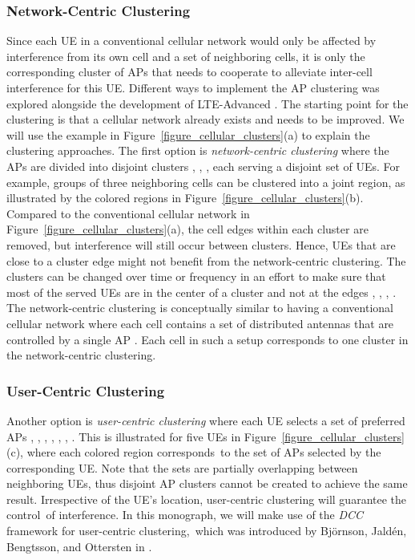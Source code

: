 \subsubsection{Network-Centric Clustering}
\enlargethispage{\baselineskip} 
Since each \gls{UE} in a conventional cellular network would only be affected by interference from its own cell and a set of neighboring cells, it is only the corresponding cluster of \glspl{AP} that needs to cooperate to alleviate inter-cell interference for this \gls{UE}. 
Different ways to implement the \gls{AP} clustering was explored alongside the development of LTE-Advanced \cite{Boldi2011a}.
The starting point for the clustering is that a cellular network already exists and needs to be improved. We will use the example in Figure~\ref{figure_cellular_clusters}(a) to explain the clustering approaches.
The first option is \emph{network-centric clustering} where the \glspl{AP} are divided into disjoint clusters \cite{Huang2009b}, \cite{Marsch2008a}, \cite{Zhang2009b}, each serving a disjoint set of \glspl{UE}. For example, groups of three neighboring cells can be clustered into a joint region, as illustrated by the colored regions in  Figure~\ref{figure_cellular_clusters}(b). Compared to the conventional cellular network in Figure~\ref{figure_cellular_clusters}(a), the cell edges within each cluster are removed, but interference will still occur between clusters. Hence, \glspl{UE} that are close to a cluster edge might not benefit from the network-centric clustering. 
The clusters can be changed over time or frequency in an effort to make sure that most of the served \glspl{UE} are in the center of a cluster and not at the edges \cite{Cayirci2002a}, \cite{Jungnickel2014a}, \cite{Marsch2011a}, \cite{Papadogiannis2009a}.
The network-centric clustering is conceptually similar to having a conventional cellular network where each cell contains a set of distributed antennas that are controlled by a single \gls{AP} \cite{Choi2007a}. Each cell in such a setup corresponds to one cluster in the network-centric clustering.


\subsubsection{User-Centric Clustering}

Another option is \emph{user-centric clustering} where each \gls{UE} selects a set of preferred  \glspl{AP}  \cite{Bjornson2011a}, \cite{Bjornson2013d}, \cite{Chen2016a}, \cite{Garcia2010a}, \cite{Kaviani2012a}, \cite{Xu2013a}, \cite{Zhang2005b}. This is illustrated for five \glspl{UE} in  Figure~\ref{figure_cellular_clusters}(c), where each colored region corresponds~to the set of \glspl{AP} selected by the corresponding \gls{UE}. Note that the sets are partially overlapping between neighboring \glspl{UE}, thus disjoint \gls{AP} clusters cannot be created to achieve the same result. Irrespective of the \gls{UE}'s location, user-centric clustering will guarantee the control~of interference.
In this monograph, we will make use of the \emph{\gls{DCC}} framework for user-centric clustering,~which was introduced by Bj{\"{o}}rnson, Jald{\'e}n, Bengtsson, and Ottersten in \cite{Bjornson2011a}.

